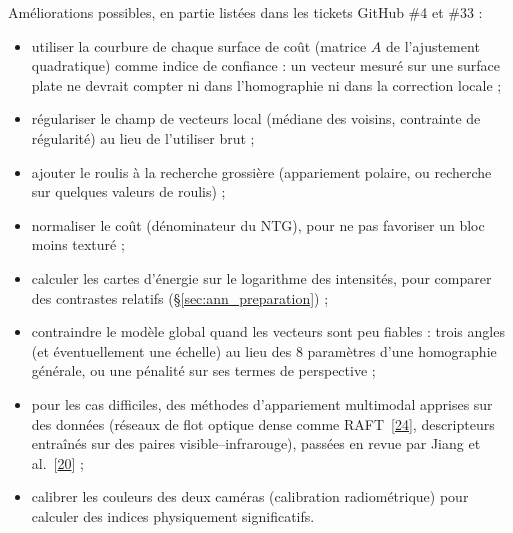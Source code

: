\documentclass[a4paper,11pt]{report}
\begin{document}
Améliorations possibles, en partie listées dans les tickets GitHub \#4 et \#33 :
\begin{itemize}
	\item utiliser la courbure de chaque surface de coût (matrice $A$ de l'ajustement quadratique) comme indice de confiance : un vecteur mesuré sur une surface plate ne devrait compter ni dans l'homographie ni dans la correction locale ;
	\item régulariser le champ de vecteurs local (médiane des voisins, contrainte de régularité) au lieu de l'utiliser brut ;
	\item ajouter le roulis à la recherche grossière (appariement polaire, ou recherche sur quelques valeurs de roulis) ;
	\item normaliser le coût (dénominateur du NTG), pour ne pas favoriser un bloc moins texturé ;
	\item calculer les cartes d'énergie sur le logarithme des intensités, pour comparer des contrastes relatifs (§\ref{sec:ann_preparation}) ;
	\item contraindre le modèle global quand les vecteurs sont peu fiables : trois angles (et éventuellement une échelle) au lieu des 8 paramètres d'une homographie générale, ou une pénalité sur ses termes de perspective ;
	\item pour les cas difficiles, des méthodes d'appariement multimodal apprises sur des données (réseaux de flot optique dense comme RAFT~[\hyperref[ann_raft]{24}], descripteurs entraînés sur des paires visible--infrarouge), passées en revue par Jiang et al.~[\hyperref[ann_jiang]{20}] ;
	\item calibrer les couleurs des deux caméras (calibration radiométrique) pour calculer des indices physiquement significatifs.
\end{itemize}
\end{document}
